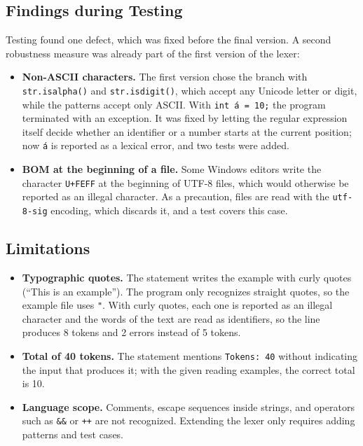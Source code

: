 \documentclass[11pt,letterpaper]{article}
\newcommand{\tok}[1]{\texttt{#1}}
\begin{document}
\subsection{Findings during Testing}

Testing found one defect, which was fixed before the final version. A second
robustness measure was already part of the first version of the lexer:

\begin{itemize}
  \item \textbf{Non-ASCII characters.} The first version chose the branch
        with \tok{str.isalpha()} and \tok{str.isdigit()}, which accept any
        Unicode letter or digit, while the patterns accept only ASCII. With
        \tok{int á = 10;} the program terminated with an exception. It was
        fixed by letting the regular expression itself decide whether an
        identifier or a number starts at the current position; now \tok{á} is
        reported as a lexical error, and two tests were added.
  \item \textbf{BOM at the beginning of a file.} Some Windows editors write
        the character \tok{U+FEFF} at the beginning of UTF-8 files, which
        would otherwise be reported as an illegal character. As a precaution,
        files are read with the \tok{utf-8-sig} encoding, which discards it,
        and a test covers this case.
\end{itemize}

\subsection{Limitations}
\label{sec:limits}

\begin{itemize}
  \item \textbf{Typographic quotes.} The statement writes the example with
        curly quotes (“This is an example”). The program only recognizes
        straight quotes, so the example file uses \tok{"}. With curly quotes,
        each one is reported as an illegal character and the words of the text
        are read as identifiers, so the line produces 8 tokens and 2 errors
        instead of 5 tokens.
  \item \textbf{Total of 40 tokens.} The statement mentions
        \tok{Tokens: 40} without indicating the input that produces it; with
        the given reading examples, the correct total is 10.
  \item \textbf{Language scope.} Comments, escape sequences inside strings,
        and operators such as \tok{\&\&} or \tok{++} are not recognized.
        Extending the lexer only requires adding patterns and test cases.
\end{itemize}
\end{document}
